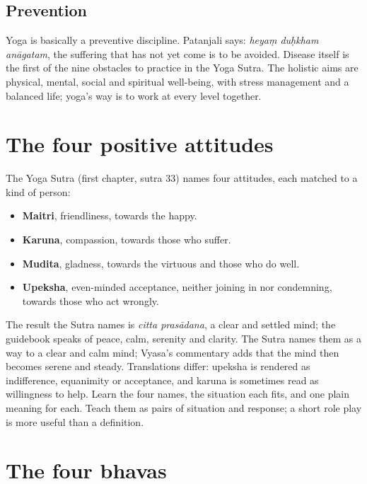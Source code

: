 \subsection*{Prevention}
Yoga is basically a preventive discipline. Patanjali says: \emph{heyaṃ duḥkham anāgatam}, the suffering that has not yet come is to be avoided. Disease itself is the first of the nine obstacles to practice in the Yoga Sutra. The holistic aims are physical, mental, social and spiritual well-being, with stress management and a balanced life; yoga's way is to work at every level together.

\section{The four positive attitudes}

The Yoga Sutra (first chapter, sutra 33) names four attitudes, each matched to a kind of person:
\begin{itemize}
\item \textbf{Maitri}, friendliness, towards the happy.
\item \textbf{Karuna}, compassion, towards those who suffer.
\item \textbf{Mudita}, gladness, towards the virtuous and those who do well.
\item \textbf{Upeksha}, even-minded acceptance, neither joining in nor condemning, towards those who act wrongly.
\end{itemize}
The result the Sutra names is \emph{citta prasādana}, a clear and settled mind; the guidebook speaks of peace, calm, serenity and clarity. The Sutra names them as a way to a clear and calm mind; Vyasa's commentary adds that the mind then becomes serene and steady. Translations differ: upeksha is rendered as indifference, equanimity or acceptance, and karuna is sometimes read as willingness to help. Learn the four names, the situation each fits, and one plain meaning for each. Teach them as pairs of situation and response; a short role play is more useful than a definition.

\section{The four bhavas}


